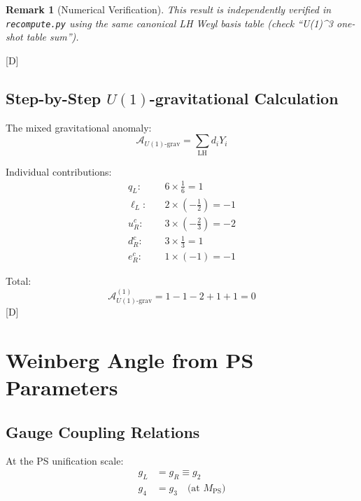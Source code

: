 \documentclass[11pt,a4paper]{article}
\newtheorem{remark}[theorem]{Remark}
\newcommand{\tagD}{\textcolor{blue!70!black}{[D]}}
\begin{document}
\begin{remark}[Numerical Verification]
This result is independently verified in \texttt{recompute.py} using the same canonical LH Weyl basis table (check ``U(1)\^{}3 one-shot table sum'').
\end{remark}
\tagD

\subsection{Step-by-Step $U(1)$-gravitational Calculation}

The mixed gravitational anomaly:
\begin{equation}
\label{eq:u1-grav-def-ext}
\mathcal{A}_{U(1)\text{-grav}} = \sum_{\text{LH}} d_i Y_i
\end{equation}

Individual contributions:
\begin{align}
\label{eq:grav-qL}
q_L: \quad & 6 \times \frac{1}{6} = 1 \\
\label{eq:grav-lL}
\ell_L: \quad & 2 \times \left(-\frac{1}{2}\right) = -1 \\
\label{eq:grav-uR}
u_R^c: \quad & 3 \times \left(-\frac{2}{3}\right) = -2 \\
\label{eq:grav-dR}
d_R^c: \quad & 3 \times \frac{1}{3} = 1 \\
\label{eq:grav-eR}
e_R^c: \quad & 1 \times (-1) = -1
\end{align}

Total:
\begin{equation}
\label{eq:grav-total}
\mathcal{A}_{U(1)\text{-grav}}^{(1)} = 1 - 1 - 2 + 1 + 1 = 0
\end{equation}
\tagD

\section{Weinberg Angle from PS Parameters}
\label{app:weinberg}

\subsection{Gauge Coupling Relations}

At the PS unification scale:
\begin{align}
\label{eq:ps-gauge-1}
g_L &= g_R \equiv g_2 \\
\label{eq:ps-gauge-2}
g_4 &= g_3 \quad \text{(at } M_{\text{PS}} \text{)}
\end{align}
\end{document}
